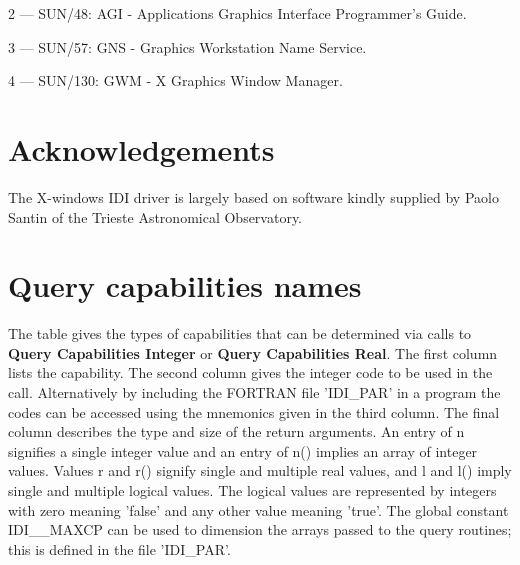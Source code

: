 2 --- SUN/48: AGI - Applications Graphics Interface Programmer's Guide.

3 --- SUN/57: GNS - Graphics Workstation Name Service.

4 --- SUN/130: GWM - X Graphics Window Manager.


\section{Acknowledgements}

The X-windows IDI driver is largely based on software kindly supplied
by Paolo Santin of the Trieste Astronomical Observatory.

\newpage
\appendix
\section{Query capabilities names}
\label{se:qcn}

The table gives the types of capabilities that can be determined via calls
to {\bf Query Capabilities Integer} or {\bf Query Capabilities Real}.
The first column lists the capability. The second column gives the
integer code to be used in the call. Alternatively by including the
FORTRAN file 'IDI\_PAR' in a program the codes can be accessed using
the mnemonics given in the third column. The final column describes
the type and size of the return arguments. An entry of n
signifies a single integer value and an entry of n() implies an
array of integer values. Values r and r() signify single and multiple
real values, and l and l() imply single and multiple logical values.
The logical values are represented by integers with zero meaning 'false'
and any other value meaning 'true'.
The global constant IDI\_\_MAXCP can be used to dimension the arrays passed
to the query routines; this is defined in the file 'IDI\_PAR'.


